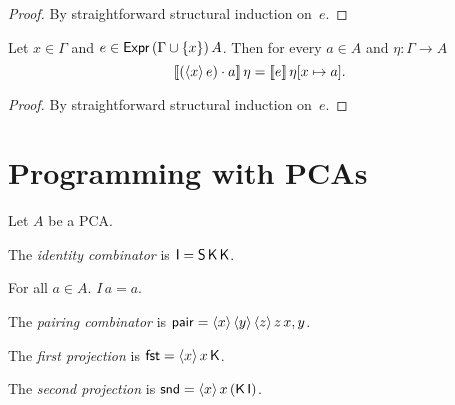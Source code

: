 \begin{proof}
  \leanok
  By straightforward structural induction on~$e$.
\end{proof}

\begin{proposition}
  \label{prop:abstraction-equal}
  \leanok
  Let $x \in \Gamma$ and $e \in \mathsf{Expr}\,(\Gamma \cup \{x\})\,A$.
  Then for every $a \in A$ and $\eta : \Gamma \to A$
  \begin{equation*}
    [\![ (\langle x \rangle\, e) \cdot a ]\!] \, \eta =
    [\![ e ]\!] \, \eta[x \mapsto a].
  \end{equation*}
\end{proposition}

\begin{proof}
  \leanok
  By straightforward structural induction on~$e$.
\end{proof}

\section{Programming with PCAs}

Let $A$ be a PCA.

\begin{definition}
  \label{def:combinator-I}
  \leanok
  The \emph{identity combinator} is $\mathsf{I} = \mathsf{S} \, \mathsf{K} \, \mathsf{K}$.
\end{definition}

\begin{proposition}
  \label{prop:equal-I}
  \leanok
  For all $a \in A$. $I \, a = a$.
\end{proposition}

\begin{definition}
  \label{def:combinator-pair}
  \leanok
  The \emph{pairing combinator} is $\mathsf{pair} = \langle x \rangle\, \langle y \rangle\, \langle z \rangle\, z \, x, y$.
\end{definition}

\begin{definition}
  \label{def:combinator-fst}
  \leanok
  The \emph{first projection} is $\mathsf{fst} = \langle x \rangle\, x \, \mathsf{K}$.
\end{definition}

\begin{definition}
  \label{def:combinator-snd}
  \leanok
  The \emph{second projection} is $\mathsf{snd} = \langle x \rangle\, x \, (\mathsf{K} \, \mathsf{I})$.
\end{definition}

